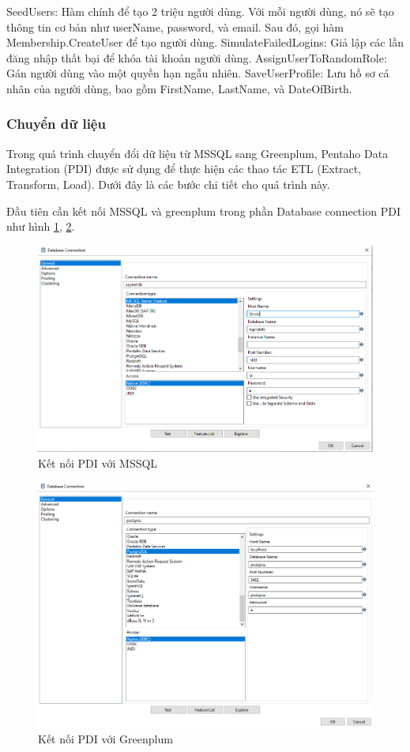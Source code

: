 \documentclass[14pt]{article}
\begin{document}
SeedUsers: Hàm chính để tạo 2 triệu người dùng. Với mỗi người dùng, nó sẽ tạo thông tin cơ bản như userName, password, và email. Sau đó, gọi hàm Membership.CreateUser để tạo người dùng.
SimulateFailedLogins: Giả lập các lần đăng nhập thất bại để khóa tài khoản người dùng.
AssignUserToRandomRole: Gán người dùng vào một quyền hạn ngẫu nhiên.
SaveUserProfile: Lưu hồ sơ cá nhân của người dùng, bao gồm FirstName, LastName, và DateOfBirth.

\subsubsection{Chuyển dữ liệu}

Trong quá trình chuyển đổi dữ liệu từ MSSQL sang Greenplum, Pentaho Data Integration (PDI) được sử dụng để thực hiện các thao tác ETL (Extract, Transform, Load). Dưới đây là các bước chi tiết cho quá trình này.

Đầu tiên cần kết nối MSSQL và greenplum trong phần Database connection PDI như hình \ref{fig:ConMSSQL}, \ref{fig:ConGreenplum}.


\begin{figure}
    \centering
    \includegraphics[width=0.8\linewidth]{images/ConMSSQL.png}
    \caption{Kết nối PDI với MSSQL}
    \label{fig:ConMSSQL}
\end{figure}


\begin{figure}
    \centering
    \includegraphics[width=0.8\linewidth]{images/ConGreenplum.png}
    \caption{Kết nối PDI với Greenplum}
    \label{fig:ConGreenplum}
\end{figure}
\end{document}
